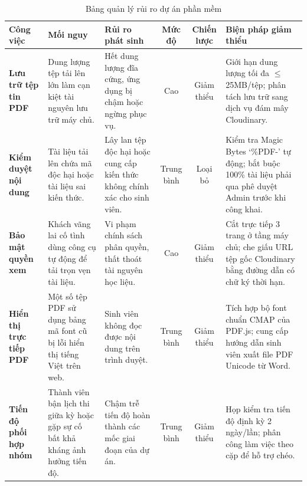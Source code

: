 \begin{table}[H]
\centering
\small
\renewcommand{\arraystretch}{1.2}
\begin{tabularx}{\textwidth}{|p{2.4cm}|p{2.6cm}|p{2.6cm}|c|c|X|}
\hline
\rowcolor[HTML]{EAEAEA}
\textbf{Công việc} & \textbf{Mối nguy} & \textbf{Rủi ro phát sinh} & \textbf{Mức độ} & \textbf{Chiến lược} & \textbf{Biện pháp giảm thiểu} \\
\hline
\textbf{Lưu trữ tệp tin PDF} & Dung lượng tệp tải lên lớn làm cạn kiệt tài nguyên lưu trữ máy chủ. & Hết dung lượng đĩa cứng, ứng dụng bị chậm hoặc ngừng phục vụ. & Cao & Giảm thiểu & Giới hạn dung lượng tối đa $\le$ 25MB/tệp; phân tách lưu trữ sang dịch vụ đám mây Cloudinary. \\
\hline
\textbf{Kiểm duyệt nội dung} & Tài liệu tải lên chứa mã độc hại hoặc tài liệu sai kiến thức. & Lây lan tệp độc hại hoặc cung cấp kiến thức không chính xác cho sinh viên. & Trung bình & Loại bỏ & Kiểm tra Magic Bytes `\%PDF-' tự động; bắt buộc 100\% tài liệu phải qua phê duyệt Admin trước khi công khai. \\
\hline
\textbf{Bảo mật quyền xem} & Khách vãng lai cố tình dùng công cụ tự động để tải trọn vẹn tài liệu. & Vi phạm chính sách phân quyền, thất thoát tài nguyên học liệu. & Cao & Giảm thiểu & Cắt trực tiếp 3 trang ở tầng máy chủ; che giấu URL tệp gốc Cloudinary bằng đường dẫn có chữ ký thời hạn. \\
\hline
\textbf{Hiển thị trực tiếp PDF} & Một số tệp PDF sử dụng bảng mã font cũ bị lỗi hiển thị tiếng Việt trên web. & Sinh viên không đọc được nội dung trên trình duyệt. & Trung bình & Giảm thiểu & Tích hợp bộ font chuẩn CMAP của PDF.js; cung cấp hướng dẫn sinh viên xuất file PDF Unicode từ Word. \\
\hline
\textbf{Tiến độ phối hợp nhóm} & Thành viên bận lịch thi giữa kỳ hoặc gặp sự cố bất khả kháng ảnh hưởng tiến độ. & Chậm trễ tiến độ hoàn thành các mốc giai đoạn của dự án. & Trung bình & Giảm thiểu & Họp kiểm tra tiến độ định kỳ 2 ngày/lần; phân công làm việc theo cặp để hỗ trợ chéo. \\
\hline
\end{tabularx}
\caption{Bảng quản lý rủi ro dự án phần mềm}
\label{tab:quan_ly_rui_ro}
\end{table}
